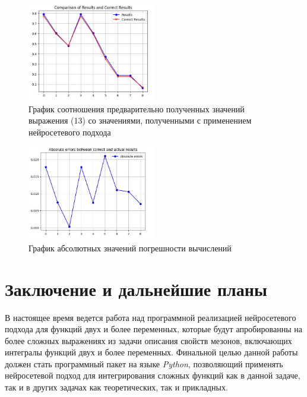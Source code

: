 \documentclass[a4paper,12pt]{article} %
\renewcommand{\figurename}{Рисунок\_}
\begin{document}
\renewcommand{\figurename}{Рисунок}
\renewcommand{\thefigure}{4}
\begin{figure}[H]
    \centering
    \includegraphics[width=0.5\textwidth]{2025-02-21 23.07.10.jpg}
    \caption{График соотношения предварительно полученных значений выражения (13) со значениями, полученными с применением нейросетевого подхода}
\end{figure}

\renewcommand{\figurename}{Рисунок}
\renewcommand{\thefigure}{5}
\begin{figure}[H]
    \centering
    \includegraphics[width=0.5\textwidth]{2025-02-21 23.07.17.jpg}
    \caption{График абсолютных значений погрешности вычислений}
\end{figure}

\section{Заключение и дальнейшие планы}

В настоящее время ведется работа над программной реализацией нейросетевого подхода для функций двух и более переменных, которые будут апробированны на более сложных выражениях из задачи описания свойств мезонов, включающих интегралы функций двух и более переменных. Финальной целью данной работы должен стать программный пакет на языке \textit{Python}, позволяющий применять нейросетевой подход для интегрирования сложных функций как в данной задаче, так и в других задачах как теоретических, так и прикладных.

\printbibliography[
heading=bibintoc,
title={Список литературы}
]
\end{document}
